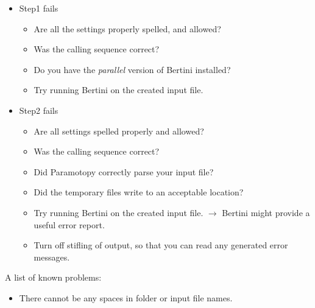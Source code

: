 \begin{itemize}
	\item Step1 fails 
		\begin{itemize}
		\item Are all the settings properly spelled, and allowed?
		\item Was the calling sequence correct?
		\item Do you have the \emph{parallel} version of Bertini installed?
		\item Try running Bertini on the created input file.
		\end{itemize}

	\item Step2 fails
		\begin{itemize}
		\item Are all settings spelled properly and allowed?
		\item Was the calling sequence correct?
		\item Did Paramotopy correctly parse your input file?
		\item Did the temporary files write to an acceptable location?
		\item Try running Bertini on the created input file. $\rightarrow$ Bertini might provide a useful error report.
		\item Turn off stifling of output, so that you can read any generated error messages.
		\end{itemize}
\end{itemize}


A list of known problems:
\begin{itemize}
	\item There cannot be any spaces in folder or input file names.  
	
\end{itemize}

\ifx\standalonemode\undefined

\else
	\begin{singlespace}
	
	
	\end{singlespace}
	
	\begin{singlespace}
	\printindex
	\end{singlespace}
\fi